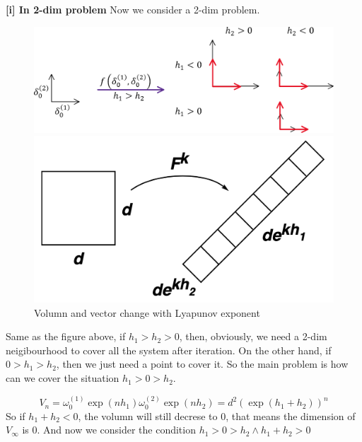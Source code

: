 \documentclass[12pt]{article}
\theoremstyle{plain}
\begin{document}
  \noindent \textbf{[i] In 2-dim problem}
Now we consider a 2-dim problem.
\begin{figure}[H]
\begin{minipage}[c][0.64\width]{
   0.58\textwidth}
   \centering
   \includegraphics[width=1\textwidth]{figure/section5/2-d-vector.png}
\end{minipage}
\begin{minipage}[c][0.35\width]{
   0.35\textwidth}
   \centering
   \includegraphics[width=1\textwidth]{figure/section5/square-under-map.png}
\end{minipage}
\caption{Volumn and vector change with Lyapunov exponent}
\end{figure}
Same as the figure above, if $h_1 > h_2 > 0$, then, obviously, we need a 2-dim neigibourhood to cover all the system after iteration. On the other hand, if $0 > h_1 > h_2$, then we just need a point to cover it. So the main problem is how can we cover the situation $h_1 > 0 > h_2$.

$$
V_{n} = \omega_0^{(1)}\exp(nh_1)\omega_0^{(2)}\exp(nh_2) = d^2\left(\exp(h_1 + h_2)\right)^n
$$
So if $h_1 + h_2 < 0$, the volumn will still decrese to 0, that means the dimension of $V_\infty$ is 0. And now we consider the condition $h_1 > 0 > h_2 \land h_1 + h_2 > 0$
\end{document}
